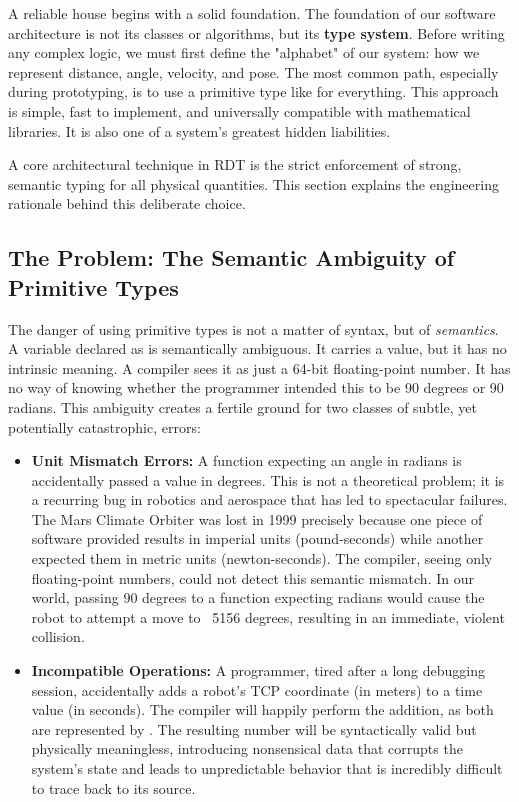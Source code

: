 A reliable house begins with a solid foundation. The foundation of our software architecture is not its classes or algorithms, but its \textbf{type system}. Before writing any complex logic, we must first define the "alphabet" of our system: how we represent distance, angle, velocity, and pose. The most common path, especially during prototyping, is to use a primitive type like  for everything. This approach is simple, fast to implement, and universally compatible with mathematical libraries. It is also one of a system's greatest hidden liabilities.

A core architectural technique in RDT is the strict enforcement of strong, semantic typing for all physical quantities. This section explains the engineering rationale behind this deliberate choice.

\subsection{The Problem: The Semantic Ambiguity of Primitive Types}
\label{subsec:problem_of_double_conceptual}

The danger of using primitive types is not a matter of syntax, but of \textit{semantics}. A variable declared as  is semantically ambiguous. It carries a value, but it has no intrinsic meaning. A compiler sees it as just a 64-bit floating-point number. It has no way of knowing whether the programmer intended this to be 90 degrees or 90 radians. This ambiguity creates a fertile ground for two classes of subtle, yet potentially catastrophic, errors:

\begin{itemize}
    \item \textbf{Unit Mismatch Errors:} A function expecting an angle in radians is accidentally passed a value in degrees. This is not a theoretical problem; it is a recurring bug in robotics and aerospace that has led to spectacular failures. The Mars Climate Orbiter was lost in 1999 precisely because one piece of software provided results in imperial units (pound-seconds) while another expected them in metric units (newton-seconds). The compiler, seeing only floating-point numbers, could not detect this semantic mismatch. In our world, passing 90 degrees to a function expecting radians would cause the robot to attempt a move to ~5156 degrees, resulting in an immediate, violent collision.
    
    \item \textbf{Incompatible Operations:} A programmer, tired after a long debugging session, accidentally adds a robot's TCP coordinate (in meters) to a time value (in seconds). The compiler will happily perform the addition, as both are represented by . The resulting number will be syntactically valid but physically meaningless, introducing nonsensical data that corrupts the system's state and leads to unpredictable behavior that is incredibly difficult to trace back to its source.
\end{itemize}

